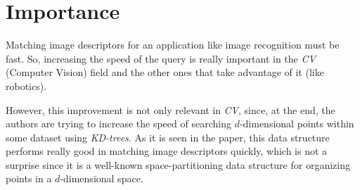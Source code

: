 \section{Importance}
Matching image descriptors for an application like image recognition must be fast. So, increasing the speed of the query is really important in the \textit{CV} (Computer Vision) field and the other ones that take advantage of it (like robotics). 

However, this improvement is not only relevant in \textit{CV}, since, at the end, the authors are trying to increase the speed of searching $d$-dimensional points within some dataset using \textit{KD-trees}. As it is seen in the paper, this data structure performs really good in matching image descriptors quickly, which is not a surprise since it is a well-known space-partitioning data structure for organizing points in a $d$-dimensional space.
